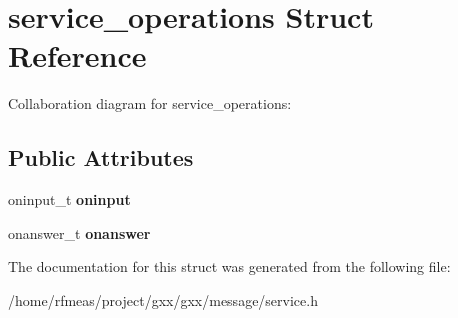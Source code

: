 \hypertarget{structservice__operations}{}\section{service\+\_\+operations Struct Reference}
\label{structservice__operations}


Collaboration diagram for service\+\_\+operations\+:
\subsection*{Public Attributes}
\begin{DoxyCompactItemize}
\item 
oninput\+\_\+t {\bfseries oninput}\hypertarget{structservice__operations_aaa53a43768a59bb5029d56e4d509ad9e}{}\label{structservice__operations_aaa53a43768a59bb5029d56e4d509ad9e}

\item 
onanswer\+\_\+t {\bfseries onanswer}\hypertarget{structservice__operations_a668054fa6cf8950033cfe60067ed5049}{}\label{structservice__operations_a668054fa6cf8950033cfe60067ed5049}

\end{DoxyCompactItemize}


The documentation for this struct was generated from the following file\+:\begin{DoxyCompactItemize}
\item 
/home/rfmeas/project/gxx/gxx/message/service.\+h\end{DoxyCompactItemize}
